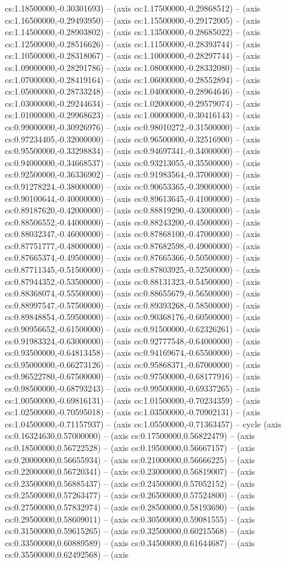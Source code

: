 cs:1.18500000,-0.30301693) -- (axis cs:1.17500000,-0.29868512) -- (axis cs:1.16500000,-0.29493950) -- (axis cs:1.15500000,-0.29172005) -- (axis cs:1.14500000,-0.28903802) -- (axis cs:1.13500000,-0.28685022) -- (axis cs:1.12500000,-0.28516626) -- (axis cs:1.11500000,-0.28393744) -- (axis cs:1.10500000,-0.28318067) -- (axis cs:1.10000000,-0.28297744) -- (axis cs:1.09000000,-0.28291786) -- (axis cs:1.08000000,-0.28332080) -- (axis cs:1.07000000,-0.28419164) -- (axis cs:1.06000000,-0.28552894) -- (axis cs:1.05000000,-0.28733248) -- (axis cs:1.04000000,-0.28964646) -- (axis cs:1.03000000,-0.29244634) -- (axis cs:1.02000000,-0.29579074) -- (axis cs:1.01000000,-0.29968623) -- (axis cs:1.00000000,-0.30416143) -- (axis cs:0.99000000,-0.30926976) -- (axis cs:0.98010272,-0.31500000) -- (axis cs:0.97234405,-0.32000000) -- (axis cs:0.96500000,-0.32516900) -- (axis cs:0.95500000,-0.33298834) -- (axis cs:0.94697341,-0.34000000) -- (axis cs:0.94000000,-0.34668537) -- (axis cs:0.93213055,-0.35500000) -- (axis cs:0.92500000,-0.36336902) -- (axis cs:0.91983564,-0.37000000) -- (axis cs:0.91278224,-0.38000000) -- (axis cs:0.90653365,-0.39000000) -- (axis cs:0.90100644,-0.40000000) -- (axis cs:0.89613645,-0.41000000) -- (axis cs:0.89187620,-0.42000000) -- (axis cs:0.88819290,-0.43000000) -- (axis cs:0.88506552,-0.44000000) -- (axis cs:0.88243200,-0.45000000) -- (axis cs:0.88032347,-0.46000000) -- (axis cs:0.87868100,-0.47000000) -- (axis cs:0.87751777,-0.48000000) -- (axis cs:0.87682598,-0.49000000) -- (axis cs:0.87665374,-0.49500000) -- (axis cs:0.87665366,-0.50500000) -- (axis cs:0.87711345,-0.51500000) -- (axis cs:0.87803925,-0.52500000) -- (axis cs:0.87944352,-0.53500000) -- (axis cs:0.88131323,-0.54500000) -- (axis cs:0.88368074,-0.55500000) -- (axis cs:0.88655679,-0.56500000) -- (axis cs:0.88997547,-0.57500000) -- (axis cs:0.89393268,-0.58500000) -- (axis cs:0.89848854,-0.59500000) -- (axis cs:0.90368176,-0.60500000) -- (axis cs:0.90956652,-0.61500000) -- (axis cs:0.91500000,-0.62326261) -- (axis cs:0.91983324,-0.63000000) -- (axis cs:0.92777548,-0.64000000) -- (axis cs:0.93500000,-0.64813458) -- (axis cs:0.94169674,-0.65500000) -- (axis cs:0.95000000,-0.66273126) -- (axis cs:0.95868371,-0.67000000) -- (axis cs:0.96522780,-0.67500000) -- (axis cs:0.97500000,-0.68177916) -- (axis cs:0.98500000,-0.68793243) -- (axis cs:0.99500000,-0.69337265) -- (axis cs:1.00500000,-0.69816131) -- (axis cs:1.01500000,-0.70234359) -- (axis cs:1.02500000,-0.70595018) -- (axis cs:1.03500000,-0.70902131) -- (axis cs:1.04500000,-0.71157937) -- (axis cs:1.05500000,-0.71363457) -- cycle (axis cs:0.16324630,0.57000000) -- (axis cs:0.17500000,0.56822479) -- (axis cs:0.18500000,0.56722528) -- (axis cs:0.19500000,0.56667157) -- (axis cs:0.20000000,0.56655934) -- (axis cs:0.21000000,0.56666225) -- (axis cs:0.22000000,0.56720341) -- (axis cs:0.23000000,0.56819007) -- (axis cs:0.23500000,0.56885437) -- (axis cs:0.24500000,0.57052152) -- (axis cs:0.25500000,0.57263477) -- (axis cs:0.26500000,0.57524800) -- (axis cs:0.27500000,0.57832974) -- (axis cs:0.28500000,0.58193690) -- (axis cs:0.29500000,0.58609011) -- (axis cs:0.30500000,0.59081555) -- (axis cs:0.31500000,0.59615265) -- (axis cs:0.32500000,0.60215568) -- (axis cs:0.33500000,0.60889589) -- (axis cs:0.34500000,0.61644687) -- (axis cs:0.35500000,0.62492568) -- (axis 